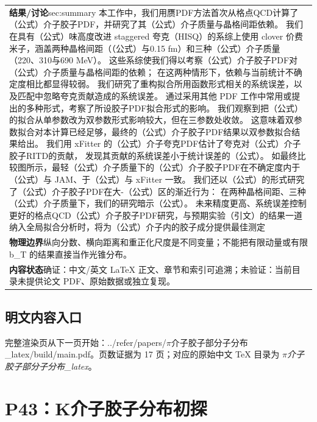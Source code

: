 \documentclass[UTF8,11pt,oneside]{ctexbook}
\begin{document}
\begin{table}[htbp]
\begin{tabular}{@{}p{}@{}}
    \textbf{结果/讨论}\quad sec:summary 本工作中，我们用赝PDF方法首次从格点QCD计算了（公式）介子胶子PDF，并研究了其（公式）介子质量与晶格间距依赖。 我们在具有（公式）味高度改进 staggered 夸克（HISQ）的系综上使用 clover 价费米子，涵盖两种晶格间距（（公式）与0.15 fm）和三种（公式）介子质量（220、310与690 MeV）。 这些系综使我们得以考察（公式）介子胶子PDF对（公式）介子质量与晶格间距的依赖； 在这两种情形下，依赖与当前统计不确定度相比都显得较弱。 我们研究了重构拟合所用函数形式相关的系统误差，以及匹配中忽略夸克贡献造成的系统误差。 通过采用其他 PDF 工作中常用或提出的多种形式，考察了所设胶子PDF拟合形式的影响。 我们观察到把（公式）的拟合从单参数改为双参数形式影响较大，但在三参数处收敛。 这意味着双参数拟合对本计算已经足够，最终的（公式）介子胶子PDF结果以双参数拟合结果给出。 我们用 xFitter 的（公式）介子夸克PDF估计了夸克对（公式）介子胶子RITD的贡献， 发现其贡献的系统误差小于统计误差的（公式）。 如最终比较图所示，最轻（公式）介子质量下的（公式）介子胶子PDF在不确定度内于（公式）与 JAM、于（公式）与 xFitter 一致。 我们还以（公式）的形式研究了（公式）介子胶子PDF在大-（公式）区的渐近行为： 在两种晶格间距、三种（公式）介子质量下，我们的研究暗示（公式）。 未来精度更高、系统误差控制更好的格点QCD（公式）介子胶子PDF研究，与预期实验（引文）的结果一道纳入全局拟合分析时，将为（公式）介子内的胶子成分提供最佳测定 \\
    \textbf{物理边界}\quad 纵向分数、横向距离和重正化尺度是不同变量；不能把有限动量或有限 b\_T 的结果直接当作光锥分布。 \\
    \textbf{内容状态}\quad 确证：中文/英文 LaTeX 正文、章节和索引可追溯；未验证：当前目录未提供论文 PDF、原始数据或独立复现。 \\
    \bottomrule
  \end{tabular}
\end{table}
\section*{明文内容入口}
\noindent 完整渲染页从下一页开始：../\allowbreak{}refer/\allowbreak{}papers/\allowbreak{}$\pi$介子胶子部分子分布\_\allowbreak{}latex/\allowbreak{}build/\allowbreak{}main.pdf。页数证据为 17 页；对应的原始中文 TeX 目录为 \emph{$\pi$介子胶子部分子分布\_latex}。
\clearpage

\clearpage

\chapter{P43：K介子胶子分布初探}
\end{document}
